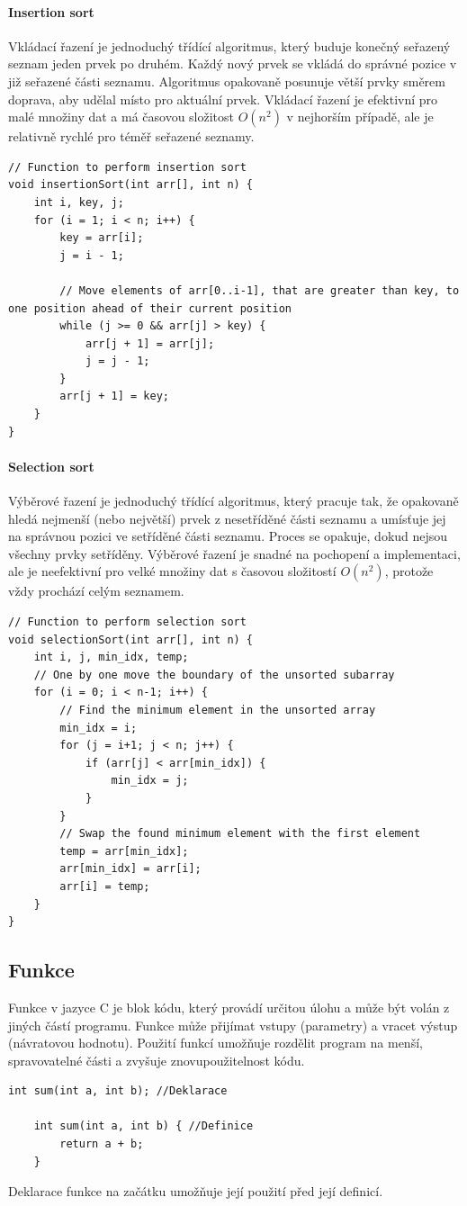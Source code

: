 \paragraph{Insertion sort}
Vkládací řazení je jednoduchý třídící algoritmus, který buduje konečný seřazený seznam jeden prvek po druhém. Každý nový prvek se vkládá do správné pozice v již seřazené části seznamu. Algoritmus opakovaně posunuje větší prvky směrem doprava, aby udělal místo pro aktuální prvek. Vkládací řazení je efektivní pro malé množiny dat a má časovou složitost $O(n^2)$ v nejhorším případě, ale je relativně rychlé pro téměř seřazené seznamy.
\begin{lstlisting}[style=mystyle]
// Function to perform insertion sort
void insertionSort(int arr[], int n) {
    int i, key, j;
    for (i = 1; i < n; i++) {
        key = arr[i];
        j = i - 1;

        // Move elements of arr[0..i-1], that are greater than key, to one position ahead of their current position
        while (j >= 0 && arr[j] > key) {
            arr[j + 1] = arr[j];
            j = j - 1;
        }
        arr[j + 1] = key;
    }
}
\end{lstlisting}
\paragraph{Selection sort}
Výběrové řazení je jednoduchý třídící algoritmus, který pracuje tak, že opakovaně hledá nejmenší (nebo největší) prvek z nesetříděné části seznamu a umísťuje jej na správnou pozici ve setříděné části seznamu. Proces se opakuje, dokud nejsou všechny prvky setříděny. Výběrové řazení je snadné na pochopení a implementaci, ale je neefektivní pro velké množiny dat s časovou složitostí $O(n^2)$, protože vždy prochází celým seznamem.
\begin{lstlisting}[style=mystyle]
// Function to perform selection sort
void selectionSort(int arr[], int n) {
    int i, j, min_idx, temp;
    // One by one move the boundary of the unsorted subarray
    for (i = 0; i < n-1; i++) {
        // Find the minimum element in the unsorted array
        min_idx = i;
        for (j = i+1; j < n; j++) {
            if (arr[j] < arr[min_idx]) {
                min_idx = j;
            }
        }
        // Swap the found minimum element with the first element
        temp = arr[min_idx];
        arr[min_idx] = arr[i];
        arr[i] = temp;
    }
}
\end{lstlisting}
\subsection{Funkce}
Funkce v jazyce C je blok kódu, který provádí určitou úlohu a může být volán z jiných částí programu. Funkce může přijímat vstupy (parametry) a vracet výstup (návratovou hodnotu). Použití funkcí umožňuje rozdělit program na menší, spravovatelné části a zvyšuje znovupoužitelnost kódu.
\begin{lstlisting}[style=mystyle]
    int sum(int a, int b); //Deklarace

    int sum(int a, int b) { //Definice
        return a + b;
    }
\end{lstlisting}
Deklarace funkce na začátku umožňuje její použití před její definicí.

